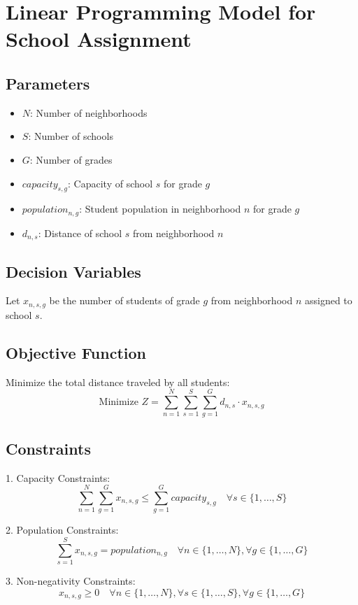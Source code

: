 \documentclass{article}
\begin{document}
\section*{Linear Programming Model for School Assignment}

\subsection*{Parameters}
\begin{itemize}
    \item \( N \): Number of neighborhoods
    \item \( S \): Number of schools
    \item \( G \): Number of grades
    \item \( capacity_{s,g} \): Capacity of school \( s \) for grade \( g \)
    \item \( population_{n,g} \): Student population in neighborhood \( n \) for grade \( g \)
    \item \( d_{n,s} \): Distance of school \( s \) from neighborhood \( n \)
\end{itemize}

\subsection*{Decision Variables}
Let \( x_{n,s,g} \) be the number of students of grade \( g \) from neighborhood \( n \) assigned to school \( s \).

\subsection*{Objective Function}
Minimize the total distance traveled by all students:
\[
\text{Minimize } Z = \sum_{n=1}^{N} \sum_{s=1}^{S} \sum_{g=1}^{G} d_{n,s} \cdot x_{n,s,g}
\]

\subsection*{Constraints}
1. Capacity Constraints:
\[
\sum_{n=1}^{N} \sum_{g=1}^{G} x_{n,s,g} \leq \sum_{g=1}^{G} capacity_{s,g} \quad \forall s \in \{1, \ldots, S\}
\]

2. Population Constraints:
\[
\sum_{s=1}^{S} x_{n,s,g} = population_{n,g} \quad \forall n \in \{1, \ldots, N\}, \forall g \in \{1, \ldots, G\}
\]

3. Non-negativity Constraints:
\[
x_{n,s,g} \geq 0 \quad \forall n \in \{1, \ldots, N\}, \forall s \in \{1, \ldots, S\}, \forall g \in \{1, \ldots, G\}
\]
\end{document}
